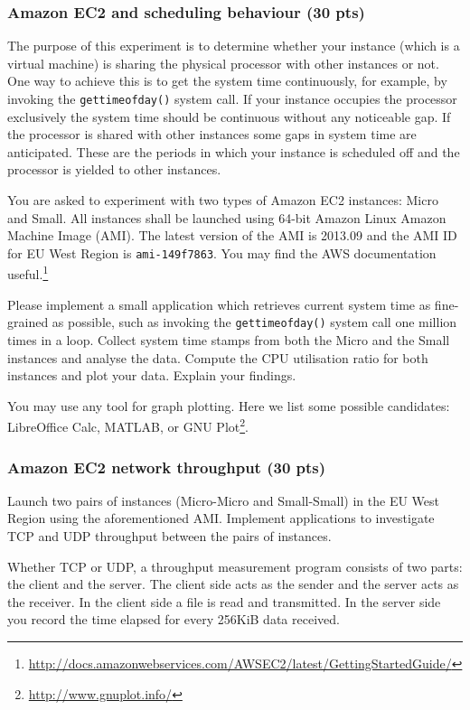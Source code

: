 \documentclass[12pt, a4paper]{article}
\begin{document}
\subsubsection{Amazon EC2 and scheduling behaviour (30 pts)}
The purpose of this experiment is to determine whether your instance (which is a virtual machine) is sharing the physical processor with other instances or not.
One way to achieve this is to get the system time continuously, for example, by invoking the \texttt{gettimeofday()} system call.
If your instance occupies the processor exclusively the system time should be continuous without any noticeable gap.
If the processor is shared with other instances some gaps in system time are anticipated.
These are the periods in which your instance is scheduled off and the processor is yielded to other instances.

You are asked to experiment with two types of Amazon EC2 instances: Micro and Small.
All instances shall be launched using 64-bit Amazon Linux Amazon Machine Image (AMI).
The latest version of the AMI is 2013.09 and the AMI ID for EU West Region is \texttt{ami-149f7863}.
You may find the AWS documentation useful.\footnote{\url{http://docs.amazonwebservices.com/AWSEC2/latest/GettingStartedGuide/}}

Please implement a small application which retrieves current system time as fine-grained as possible, such as invoking the \texttt{gettimeofday()} system call one million times in a loop.
Collect system time stamps from both the Micro and the Small instances and analyse the data.
Compute the CPU utilisation ratio for both instances and plot your data.
Explain your findings.

You may use any tool for graph plotting.
Here we list some possible candidates: LibreOffice Calc, MATLAB, or GNU Plot\footnote{\url{http://www.gnuplot.info/}}.

\subsubsection{Amazon EC2 network throughput (30 pts)}
Launch two pairs of instances (Micro-Micro and Small-Small) in the EU West Region using the aforementioned AMI.
Implement applications to investigate TCP and UDP throughput between the pairs of instances.

Whether TCP or UDP, a throughput measurement program consists of two parts: the client and the server.
The client side acts as the sender and the server acts as the receiver.
In the client side a file is read and transmitted.
In the server side you record the time elapsed for every 256KiB data received.
\end{document}
